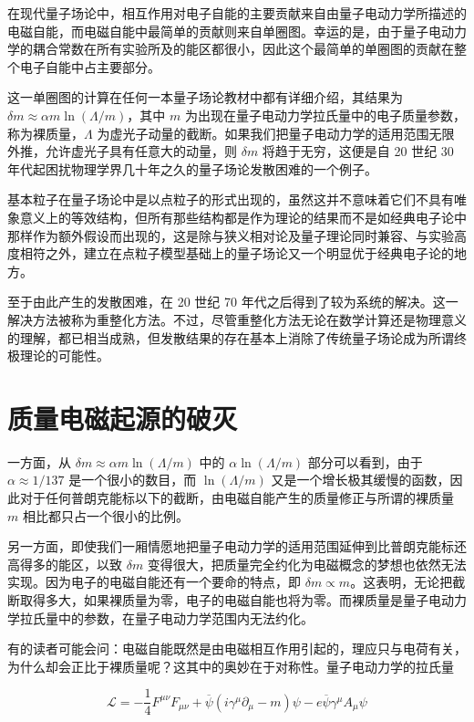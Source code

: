 \documentclass[oneside,a4paper,openany,11pt]{ctexbook}
\begin{document}
在现代量子场论中，相互作用对电子自能的主要贡献来自由量子电动力学所描述的电磁自能，而电磁自能中最简单的贡献则来自单圈图。幸运的是，由于量子电动力学的耦合常数在所有实验所及的能区都很小，因此这个最简单的单圈图的贡献在整个电子自能中占主要部分。

这一单圈图的计算在任何一本量子场论教材中都有详细介绍，其结果为 $\delta m \approx \alpha m \ln(\Lambda/m)$，其中 $m$ 为出现在量子电动力学拉氏量中的电子质量参数，称为裸质量，$\Lambda$ 为虚光子动量的截断。如果我们把量子电动力学的适用范围无限外推，允许虚光子具有任意大的动量，则 $\delta m$ 将趋于无穷，这便是自 20 世纪 30 年代起困扰物理学界几十年之久的量子场论发散困难的一个例子。

基本粒子在量子场论中是以点粒子的形式出现的，虽然这并不意味着它们不具有唯象意义上的等效结构，但所有那些结构都是作为理论的结果而不是如经典电子论中那样作为额外假设而出现的，这是除与狭义相对论及量子理论同时兼容、与实验高度相符之外，建立在点粒子模型基础上的量子场论又一个明显优于经典电子论的地方。

至于由此产生的发散困难，在 20 世纪 70 年代之后得到了较为系统的解决。这一解决方法被称为重整化方法。不过，尽管重整化方法无论在数学计算还是物理意义的理解，都已相当成熟，但发散结果的存在基本上消除了传统量子场论成为所谓终极理论的可能性。

\section{质量电磁起源的破灭}

一方面，从 $\delta m\approx \alpha m \ln(\Lambda/m)$ 中的 $\alpha \ln(\Lambda/m)$ 部分可以看到，由于 $\alpha\approx 1/137$ 是一个很小的数目，而 $\ln(\Lambda/m)$ 又是一个增长极其缓慢的函数，因此对于任何普朗克能标以下的截断，由电磁自能产生的质量修正与所谓的裸质量 $m$ 相比都只占一个很小的比例。

另一方面，即使我们一厢情愿地把量子电动力学的适用范围延伸到比普朗克能标还高得多的能区，以致 $\delta m$ 变得很大，把质量完全约化为电磁概念的梦想也依然无法实现。因为电子的电磁自能还有一个要命的特点，即 $\delta m \propto m$。这表明，无论把截断取得多大，如果裸质量为零，电子的电磁自能也将为零。而裸质量是量子电动力学拉氏量中的参数，在量子电动力学范围内无法约化。

有的读者可能会问：电磁自能既然是由电磁相互作用引起的，理应只与电荷有关，为什么却会正比于裸质量呢？这其中的奥妙在于对称性。量子电动力学的拉氏量

\begin{equation}
    \mathcal{L} = -\frac{1}{4} F^{\mu\nu} F_{\mu\nu} + \overline{\psi}(i\gamma^\mu\partial_\mu - m) \psi - e \overline{\psi} \gamma^\mu A_\mu \psi
\end{equation}
\end{document}
